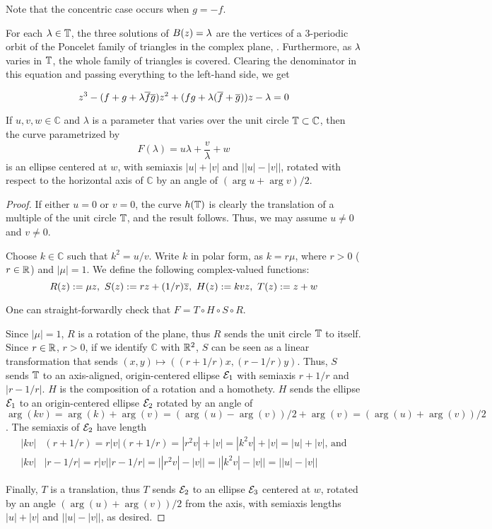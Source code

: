\noindent Note that the concentric case occurs when $g=-f$.

For each $\lambda\in\mathbb{T}$, the three solutions of $B(z)=\lambda$ are the vertices of a 3-periodic orbit of the Poncelet family of triangles in the complex plane, \cite[Chapter 4]{daepp-2019}. Furthermore, as $\lambda$ varies in $\mathbb{T}$, the whole family of triangles is covered. Clearing the denominator in this equation and passing everything to the left-hand side, we get

\[
z^3-(f+g+\lambda\overline{f} \overline{g})z^2+(f g+\lambda(\overline f+\overline g))z-\lambda=0
\]

\begin{lemma}
If $u,v,w\in\mathbb{C}$ and $\lambda$ is a parameter that varies over the unit circle $\mathbb{T}\subset\mathbb{C}$, then the curve parametrized by
\[ F(\lambda)=u \lambda+ \frac{v}{\lambda}+w \]
is an ellipse centered at $w$, with semiaxis $|u|+|v|$ and $\big||u|-|v|\big|$, rotated with respect to the horizontal axis of $\mathbb{C}$ by an angle of $(\arg u+\arg v)/2$.
\label{lem:ell-param}
\end{lemma}

\begin{proof}
If either $u=0$ or $v=0$, the curve $h(\mathbb{T})$ is clearly the translation of a multiple of the unit circle $\mathbb{T}$, and the result follows. Thus, we may assume $u\neq 0$ and $v\neq 0$.

Choose $k\in\mathbb{C}$ such that $k^2=u/v$. Write $k$ in polar form, as $k=r \mu$, where $r>0$ ($r\in\mathbb{R}$) and $|\mu|=1$. We define the following complex-valued functions:
\[R(z):=\mu z,~ S(z):=r z+(1/r) \overline{z},~ H(z):=k v z,~ T(z):=z+w\]

One can straight-forwardly check that $F=T\circ H\circ S\circ R$.

Since $|\mu|=1$, $R$ is a rotation of the plane, thus $R$ sends the unit circle $\mathbb{T}$ to itself. Since $r\in\mathbb{R}$, $r>0$, if we identify $\mathbb{C}$ with $\mathbb{R}^2$, $S$ can be seen as a linear transformation that sends $(x,y)\mapsto\left(\left(r+1/r\right)x,\left(r-1/r\right)y\right)$. Thus, $S$ sends $\mathbb{T}$ to an axis-aligned, origin-centered ellipse $\mathcal{E}_1$ with semiaxis $r+1/r$ and $|r-1/r|$. $H$ is the composition of a rotation and a homothety. $H$ sends the ellipse $\mathcal{E}_1$ to an origin-centered ellipse $\mathcal{E}_2$ rotated by an angle of $\arg(k v)=\arg(k)+\arg(v)=(\arg(u)-\arg(v))/2+\arg(v)=(\arg(u)+\arg(v))/2$. The semiaxis of $\mathcal{E}_2$ have length
\begin{align*}
|k v|&(r+1/r)=r|v|(r+1/r)=|r^2 v|+|v|=|k^2 v|+|v|=|u|+|v|\text{, and}\\
|k v|&|r-1/r|=r|v||r-1/r|=\big||r^2 v|-|v|\big|=\big||k^2 v|-|v|\big|=\big||u|-|v|\big|
\end{align*}

Finally, $T$ is a translation, thus $T$ sends $\mathcal{E}_2$ to an ellipse $\mathcal{E}_3$ centered at $w$, rotated by an angle $(\arg(u)+\arg(v))/2$ from the axis, with semiaxis lengths $|u|+|v|$ and $\big||u|-|v|\big|$, as desired.
\end{proof}

